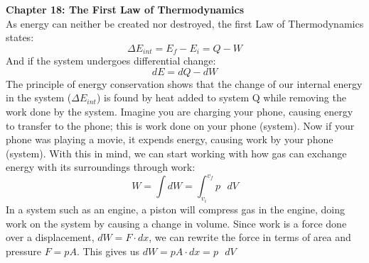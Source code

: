\documentclass[11pt]{article}
\begin{document}
    \newpage
    \noindent \textbf{Chapter 18: The First Law of Thermodynamics}
    \\ \noindent \newline As energy can neither be created nor destroyed, the first Law of Thermodynamics states:
    \begin{equation}
        \Delta E_{int} = E_f - E_i = Q - W \tag{first law}
    \end{equation}
    \noindent And if the system undergoes differential change:
    \begin{equation}
        dE = dQ - dW \tag{first law}
    \end{equation}
    The principle of energy conservation shows that the change of our internal energy in the system ($\Delta E_{int}$)
    is found by heat added to system Q while removing the work done by the system.
    Imagine you are charging your phone, causing energy to transfer to the phone;
    this is work done on your phone (system).
    Now if your phone was playing a movie, it expends energy, causing work by your phone (system).
    With this in mind, we can start working with how gas can exchange energy with its surroundings through work:
    \begin{equation}
        W = \int dW = \int_{v_i}^{v_f} p \text{ } dV \tag{work}
    \end{equation}
    In a system such as an engine, a piston will compress gas in the engine, doing work on the system by
    causing a change in volume.
    Since work is a force done over a displacement, $dW = F \cdot dx$,
    we can rewrite the force in terms of area and pressure $F = pA$.
    This gives us $dW = pA \cdot dx = p \text{ }dV$
\end{document}
